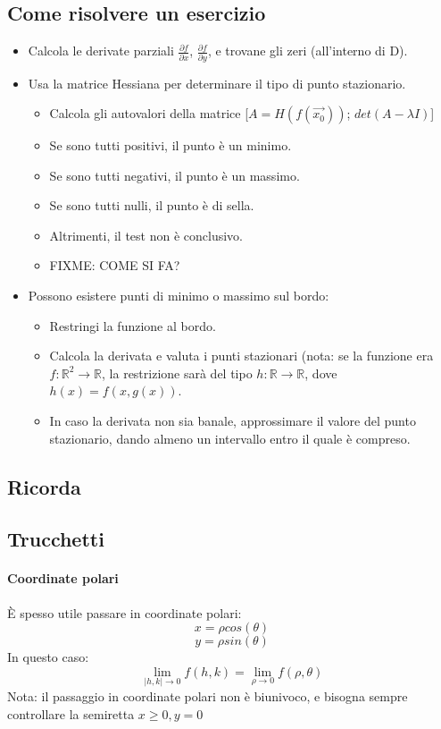 \documentclass[a4paper,10pt]{book}
\begin{document}
\subsection{Come risolvere un esercizio}
\begin{itemize}
\item Calcola le derivate parziali $\frac{\partial f}{\partial x}$, $\frac{\partial f}{\partial y}$, e trovane gli zeri (all'interno di D).
\item Usa la matrice Hessiana per determinare il tipo di punto stazionario.
\begin{itemize}
 \item Calcola gli autovalori della matrice [$A = H(f(\vec{x_0}))$; $det(A-\lambda I)$]
 \item Se sono tutti positivi, il punto è un minimo.
 \item Se sono tutti negativi, il punto è un massimo.
 \item Se sono tutti nulli, il punto è di sella.
 \item Altrimenti, il test non è conclusivo.
 \item FIXME: COME SI FA?
\end{itemize}
\item Possono esistere punti di minimo o massimo sul bordo:
\begin{itemize}
 \item Restringi la funzione al bordo.
 \item Calcola la derivata e valuta i punti stazionari (nota: se la funzione era $f: \mathbb{R}^2 \rightarrow \mathbb{R}$, la restrizione sarà del tipo $h: \mathbb{R} \rightarrow \mathbb{R}$, dove $h(x) = f(x, g(x))$.
 \item In caso la derivata non sia banale, approssimare il valore del punto stazionario, dando almeno un intervallo entro il quale è compreso.
\end{itemize}
\end{itemize}

\subsection{Ricorda}
\subsection{Trucchetti}

\paragraph{Coordinate polari}
È spesso utile passare in coordinate polari: $$ x = \rho cos(\theta)$$ $$ y = \rho sin(\theta) $$
In questo caso: $$ \lim_{|h,k| \to 0} f(h, k) = \lim_{\rho \to 0} f(\rho, \theta)$$
Nota: il passaggio in coordinate polari non è biunivoco, e bisogna sempre controllare la semiretta $x\geq0, y=0$
\end{document}
